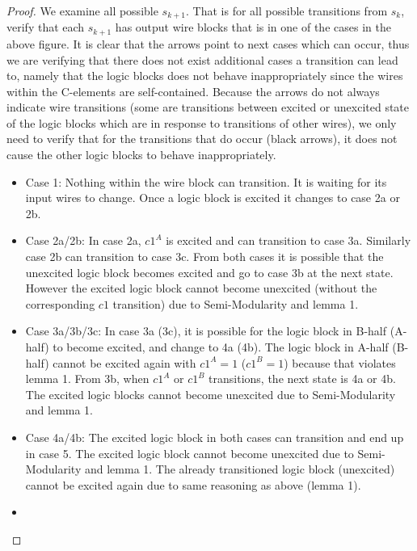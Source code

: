 \documentclass[12pt]{report}
\begin{document}
\begin{proof}
We examine all possible $s_{k+1}$.  That is for all possible transitions from $s_k$, verify that each $s_{k+1}$ has output wire blocks that is in one of the cases in the above figure.  It is clear that the arrows point to next cases which can occur, thus we are verifying that there does not exist additional cases a transition can lead to, namely that the logic blocks does not behave inappropriately since the wires within the C-elements are self-contained.  Because the arrows do not always indicate wire transitions (some are transitions between excited or unexcited state of the logic blocks which are in response to transitions of other wires), we only need to verify that for the transitions that do occur (black arrows), it does not cause the other logic blocks to behave inappropriately.
\begin{itemize}
\item
Case 1:  Nothing within the wire block can transition.  It is waiting for its input wires to change.  Once a logic block is excited it changes to case 2a or 2b. %
\item
Case 2a/2b:  In case 2a, $c1^A$ is excited and can transition to case 3a.  Similarly case 2b can transition to case 3c.  From both cases it is possible that the unexcited logic block becomes excited and go to case 3b at the next state.  However the excited logic block cannot become unexcited (without the corresponding $c1$ transition) due to Semi-Modularity and lemma 1.
\item
Case 3a/3b/3c:  In case 3a (3c), it is possible for the logic block in B-half (A-half) to become excited, and change to 4a (4b).  The logic block in A-half (B-half) cannot be excited again with $c1^A=1$ ($c1^B=1$) because that violates lemma 1.  From 3b, when $c1^A$ or $c1^B$ transitions, the next state is 4a or 4b.  The excited logic blocks cannot become unexcited due to Semi-Modularity and lemma 1.
\item
Case 4a/4b:
The excited logic block in both cases can transition and end up in case 5.  The excited logic block cannot become unexcited due to Semi-Modularity and lemma 1.  The already transitioned logic block (unexcited) cannot be excited again due to same reasoning as above (lemma 1).
\item

\end{itemize}
\end{proof}
\end{document}
